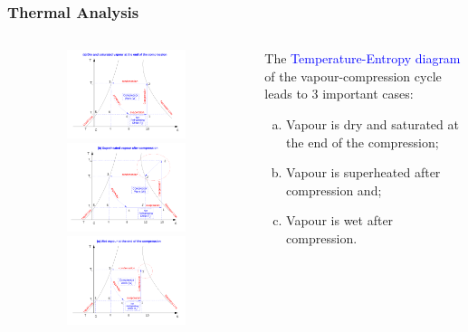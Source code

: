 \documentclass[10pt,compress]{beamer}
\begin{document}
\begin{frame}
 \frametitle{Thermal Analysis}
 \begin{columns}
  \begin{column}[c]{0.65\linewidth}
   \begin{figure}%
     \vbox{
      \includegraphics[width=5.4cm,height=2.6cm,clip]{./Pics/Overview_Refrig14}
      \vspace{-.1cm}
      \includegraphics[width=5.4cm,height=2.6cm,clip]{./Pics/Overview_Refrig15}
      \vspace{-.1cm}
      \includegraphics[width=5.4cm,height=2.6cm,clip]{./Pics/Overview_Refrig16}}
   \end{figure}  
  \end{column}  
  \begin{column}[c]{0.35\linewidth}
The \textcolor{blue}{Temperature-Entropy diagram} of the vapour-compression cycle leads to 3 important cases:
   \begin{enumerate}[(a)]
    \item <2-> Vapour is dry and saturated at the end of the compression;
    \item <3-> Vapour is superheated after compression and;
    \item <4-> Vapour is wet after compression.
   \end{enumerate}
  \end{column}  
 \end{columns}
\end{frame}
\end{document}
